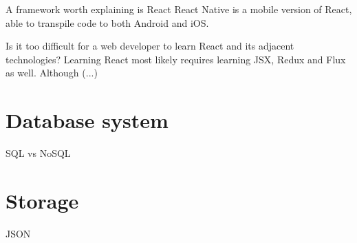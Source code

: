 A framework worth explaining is React
React Native is a mobile version of React, able to transpile code to both Android and iOS.

Is it too difficult for a web developer to learn React and its adjacent technologies? Learning React most likely requires learning JSX, Redux and Flux as well. Although (...)

\section{Database system}

SQL vs NoSQL

\section{Storage}

JSON



